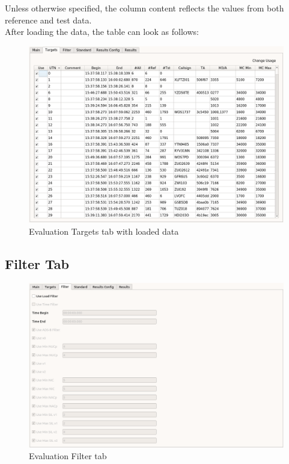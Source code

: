 Unless otherwise specified, the column content reflects the values from both reference and test data. \\

After loading the data, the table can look as follows:

\begin{figure}[H]
  \hspace*{-2cm}
    \includegraphics[width=18cm,frame]{figures/eval_targets_loaded.png}
  \caption{Evaluation Targets tab with loaded data}
\end{figure}

\subsection{Filter Tab}

\begin{figure}[H]
  \hspace*{-2cm}
    \includegraphics[width=18cm,frame]{figures/eval_filter.png}
  \caption{Evaluation Filter tab}
\end{figure}

